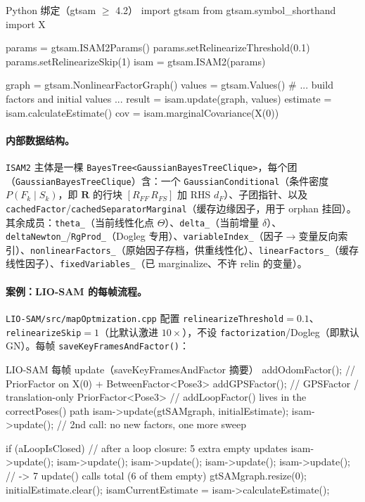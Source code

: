 \begin{codebox}[Python]{Python 绑定（gtsam $\ge$ 4.2）}
import gtsam
from gtsam.symbol_shorthand import X

params = gtsam.ISAM2Params()
params.setRelinearizeThreshold(0.1)
params.setRelinearizeSkip(1)
isam = gtsam.ISAM2(params)

graph  = gtsam.NonlinearFactorGraph()
values = gtsam.Values()
# ... build factors and initial values ...
result   = isam.update(graph, values)
estimate = isam.calculateEstimate()
cov      = isam.marginalCovariance(X(0))
\end{codebox}

\paragraph{内部数据结构。}
\texttt{ISAM2} 主体是一棵 \texttt{BayesTree<GaussianBayesTreeClique>}，每个团（\texttt{GaussianBayesTreeClique}）含：一个 \texttt{GaussianConditional}（条件密度 $P(F_k\mid S_k)$，即 $\mathbf{R}$ 的行块 $[R_{FF}\,R_{FS}]$ 加 RHS $d_F$）、子团指针、以及 \texttt{cachedFactor}/\texttt{cachedSeparatorMarginal}（缓存边缘因子，用于 orphan 挂回）。其余成员：\texttt{theta\_}（当前线性化点 $\Theta$）、\texttt{delta\_}（当前增量 $\delta$）、\texttt{deltaNewton\_}/\texttt{RgProd\_}（Dogleg 专用）、\texttt{variableIndex\_}（因子$\to$变量反向索引）、\texttt{nonlinearFactors\_}（原始因子存档，供重线性化）、\texttt{linearFactors\_}（缓存线性因子）、\texttt{fixedVariables\_}（已 marginalize、不许 relin 的变量）。

\paragraph{案例：LIO-SAM 的每帧流程。}
\texttt{LIO-SAM/src/mapOptmization.cpp} 配置 \texttt{relinearizeThreshold}$=0.1$、\texttt{relinearizeSkip}$=1$（比默认激进 $10\times$），不设 \texttt{factorization}/Dogleg（即默认 GN）。每帧 \texttt{saveKeyFramesAndFactor()}：

\begin{codebox}[C++]{LIO-SAM 每帧 update（saveKeyFramesAndFactor 摘要）}
addOdomFactor();        // PriorFactor on X(0) + BetweenFactor<Pose3>
addGPSFactor();         // GPSFactor / translation-only PriorFactor<Pose3>
// addLoopFactor() lives in the correctPoses() path
isam->update(gtSAMgraph, initialEstimate);
isam->update();         // 2nd call: no new factors, one more sweep

if (aLoopIsClosed) {    // after a loop closure: 5 extra empty updates
    isam->update(); isam->update(); isam->update();
    isam->update(); isam->update();   // -> 7 update() calls total (6 of them empty)
}
gtSAMgraph.resize(0);
initialEstimate.clear();
isamCurrentEstimate = isam->calculateEstimate();
\end{codebox}

